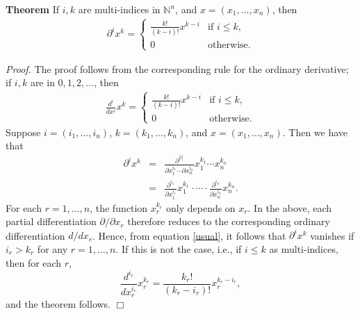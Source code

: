 \documentclass[12pt]{article}
\newcommand{\sN}[0]{\mathbb{N}}
\begin{document}
{\bf Theorem}
If $i,k$ are multi-indices in $\sN^n$, and $x=(x_1,\ldots, x_n)$, 
then 
\begin{eqnarray*}
\partial^i x^k = \left\{ \begin {array}{ll} 
 \frac{k!}{(k-i)!} x^{k-i} & \mbox{if}\,\, i\le k, \\
                         0 & \mbox{otherwise}.
 \end{array} \right.
\end{eqnarray*}

\emph{Proof.} The proof follows from the corresponding rule for 
the ordinary derivative; if $i,k$ are in $0,1,2,\ldots$, then 
\begin{eqnarray}
\label{usual}
\frac{d^i}{dx^i} x^k = \left\{ \begin {array}{ll}  \frac{k!}{(k-i)!} x^{k-i} & \mbox{if}\,\, i\le k, \\
0 & \mbox{otherwise.} 
 \end{array} \right.
\end{eqnarray}
Suppose $i=(i_1,\ldots, i_n)$, $k=(k_1,\ldots, k_n)$, and 
$x=(x_1,\ldots, x_n)$. 
Then we have that 
\begin{eqnarray*}
\partial^i x^k &=& \frac{\partial^{|i|}}{\partial x_1^{i_1} \cdots \partial x_n^{i_n}} x_1^{k_1} \cdots x_n^{k_n} \\
 &=& \frac{\partial^{i_1}}{\partial x_1^{i_1}} x_1^{k_1} \cdot \cdots \cdot  \frac{\partial^{i_n}}{\partial x_n^{i_n}} x_n^{k_n}.
\end{eqnarray*}
For each $r=1,\ldots, n$, the function $x_r^{k_r}$ only depends on $x_r$. 
In the above, each 
partial differentiation $\partial/\partial x_r$ therefore
reduces to the corresponding 
ordinary differentiation $d/dx_r$. 
Hence, from equation \ref{usual}, it follows that $\partial^i x^k$ vanishes
if $i_r > k_r$ for any  $r=1,\ldots, n$. If this is not the case, i.e., 
if $i\le k$ as multi-indices, then for each $r$, 
$$\frac{d^{i_r}}{dx_r^{i_r}} x_r^{k_r} =  \frac{k_r!}{(k_r-i_r)!} x_r^{k_r-i_r},$$
and the theorem follows. $\Box$
\end{document}
